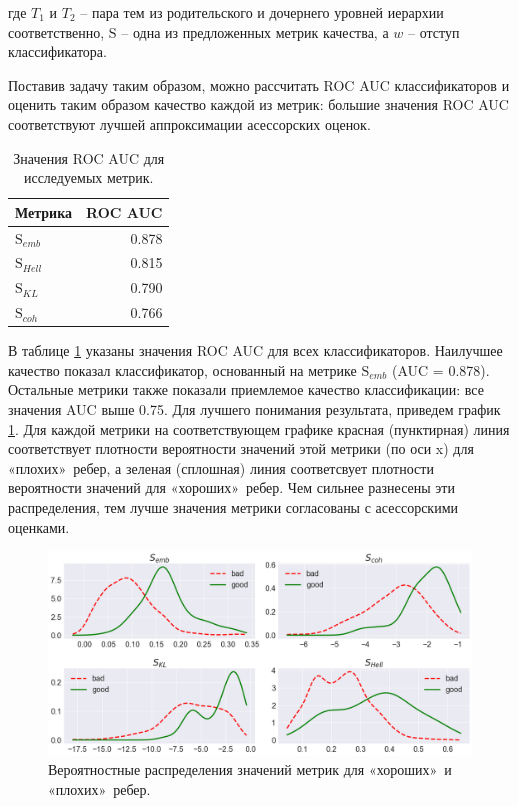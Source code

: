 где $T_1$ и $T_2$ -- пара тем из родительского и дочернего уровней иерархии соответственно, $\mathrm{S}$ -- одна из предложенных метрик качества, а $w$ -- отступ классификатора. 

Поставив задачу таким образом, можно рассчитать ROC AUC классификаторов и оценить таким образом качество каждой из метрик: большие значения ROC AUC соответствуют лучшей аппроксимации асессорских оценок.

\begin{table}[h!]
\centering

\begin{tabular}{l|r}
Метрика       & ROC AUC \\
\hline
$\mathrm{S}_{emb}$ &  0.878  \\
\hline
$\mathrm{S}_{Hell}$ &  0.815  \\
\hline
$\mathrm{S}_{KL}$ &  0.790  \\
\hline
$\mathrm{S}_{coh}$ &  0.766  \\
\end{tabular}
\caption{\label{table:metrics_results}Значения ROC AUC для исследуемых метрик.}
\end{table}

В таблице \ref{table:metrics_results} указаны значения ROC AUC для всех классификаторов. Наилучшее качество показал классификатор, основанный на метрике $\mathrm{S}_{emb}$ (AUC = 0.878). Остальные метрики также показали приемлемое качество классификации: все значения AUC выше 0.75. Для лучшего понимания результата, приведем график \ref{fig:metrics_distr}. Для каждой метрики на соответствующем графике красная (пунктирная) линия соответствует плотности вероятности значений этой метрики (по оси x) для «плохих»\ ребер, а зеленая (сплошная) линия соответсвует плотности вероятности значений для «хороших»\ ребер. Чем сильнее разнесены эти распределения, тем лучше значения метрики согласованы с асессорскими оценками.

\begin{figure}[h!]
	\includegraphics[width=\textwidth]{img/metrics_distr.png}
	\caption{\label{fig:metrics_distr}Вероятностные распределения значений метрик для «хороших»\ и «плохих»\ ребер.}
\end{figure}

